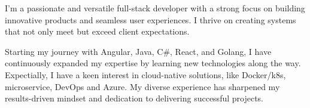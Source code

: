 I'm a passionate and versatile full-stack developer with a strong focus on building innovative products 
and seamless user experiences.  
I thrive on creating systems that not only meet but exceed client expectations.  

Starting my journey with Angular, Java, C\#, React, and Golang, 
I have continuously expanded my expertise by learning new technologies along the way.  
Expectially, I have a keen interest in cloud-native solutions, like Docker/k8s, microservice, DevOps and Azure. 
My diverse experience has sharpened my results-driven mindset and dedication to delivering successful projects.  

\vspace{\baselineskip}  
